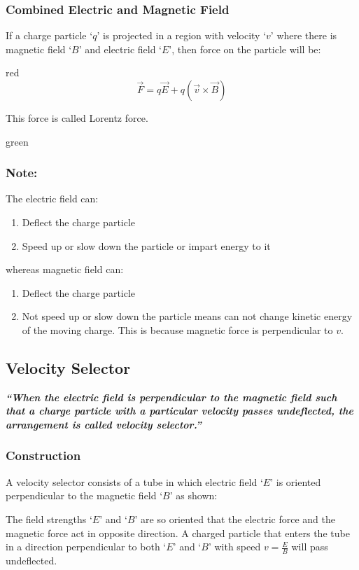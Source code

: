 \subsubsection{Combined Electric and Magnetic Field}
If a charge particle ‘$q$’ is projected in a region with velocity ‘$v$’ where there is magnetic field ‘$B$’ and electric field ‘$E$’, then force on the particle will be:
\begin{mybox}{red}{}
\begin{equation}\label{eq:13.34}
    \vec{F}=q\vec{E} + q(\vec{v} \times \vec{B})
\end{equation}
\end{mybox}
\noindent This force is called Lorentz force.
\begin{mybox}{green}{}
\subsubsection*{\note{}Note:}
The electric field can:
\begin{enumerate}
[label = (\alph*)]
\item Deflect the charge particle
\item Speed up or slow down the particle or impart energy to it
\end{enumerate}
whereas magnetic field can:
\begin{enumerate}[label = (\alph*)]
\item Deflect the charge particle
\item Not speed up or slow down the particle means can not change kinetic energy of the moving charge. This is because magnetic force is perpendicular to $v$.
\end{enumerate}
\end{mybox}
\subsection{Velocity Selector}
\textit{\textbf{“When the electric field is perpendicular to the magnetic field such that a charge particle with a particular velocity passes undeflected, the arrangement is called velocity selector.”}}

\subsubsection{Construction}
A velocity selector consists of a tube in which electric field ‘$E$’ is oriented perpendicular to the magnetic field ‘$B$’ as shown:

The field strengths ‘$E$’ and ‘$B$’ are so oriented that the electric force and the magnetic force act in opposite direction. A charged particle that enters the tube in a direction perpendicular to both ‘$E$’ and ‘$B$’ with speed $v=\frac{E}{B}$ will pass undeflected.


